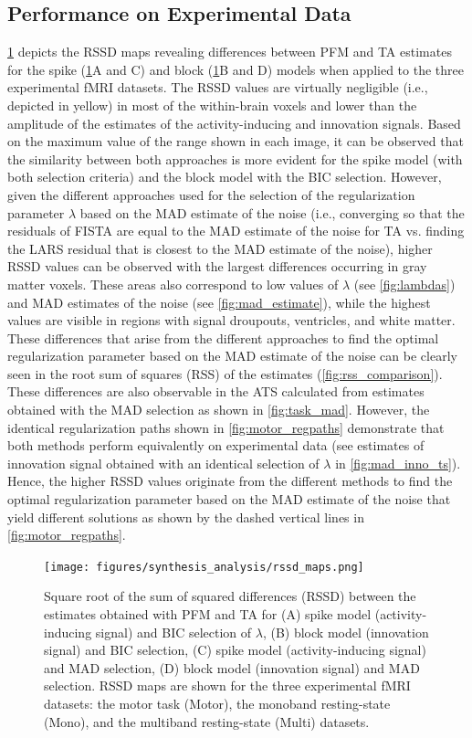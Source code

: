 \subsection{Performance on Experimental Data}

\cref{fig:rss} depicts the RSSD maps revealing differences between
PFM and TA estimates for the spike (\cref{fig:rss}A and C) and block
(\cref{fig:rss}B and D) models when applied to the three experimental fMRI
datasets. The RSSD values are virtually negligible (i.e., depicted in yellow) in
most of the within-brain voxels and lower than the amplitude of the estimates of
the activity-inducing and innovation signals. Based on the maximum value of the
range shown in each image, it can be observed that the similarity between both
approaches is more evident for the spike model (with both selection criteria)
and the block model with the BIC selection. However, given the different
approaches used for the selection of the regularization parameter $\lambda$
based on the MAD estimate of the noise (i.e., converging so that the residuals
of FISTA are equal to the MAD estimate of the noise for TA vs. finding the LARS
residual that is closest to the MAD estimate of the noise), higher RSSD values
can be observed with the largest differences occurring in gray matter voxels.
These areas also correspond to low values of $\lambda$ (see \cref{fig:lambdas})
and MAD estimates of the noise (see \cref{fig:mad_estimate}), while the highest
values are visible in regions with signal droupouts, ventricles, and white
matter. These differences that arise from the different approaches to find the
optimal regularization parameter based on the MAD estimate of the noise can be
clearly seen in the root sum of squares (RSS) of the estimates
(\cref{fig:rss_comparison}). These differences are also observable in the
ATS calculated from estimates obtained with the MAD selection as
shown in \cref{fig:task_mad}. However, the identical regularization paths shown
in \cref{fig:motor_regpaths} demonstrate that both methods perform equivalently
on experimental data (see estimates of innovation signal obtained with an
identical selection of $\lambda$ in \cref{fig:mad_inno_ts}). Hence, the higher
RSSD values originate from the different methods to find the optimal
regularization parameter based on the MAD estimate of the noise that yield
different solutions as shown by the dashed vertical lines in
\cref{fig:motor_regpaths}.

\begin{figure}[t!]
    \begin{center}
        \texttt{[image: figures/synthesis\_analysis/rssd\_maps.png]}
    \end{center}
    \caption{Square root of the sum of squared differences (RSSD) between the estimates obtained with PFM and TA for (A) spike model (activity-inducing signal) and BIC selection of $\lambda$, (B) block model (innovation signal) and BIC selection, (C) spike model (activity-inducing signal) and MAD selection, (D) block model (innovation signal) and MAD selection. RSSD maps are shown for the three experimental fMRI datasets: the motor task (Motor), the monoband resting-state (Mono), and the multiband resting-state (Multi) datasets.}
\label{fig:rss}
\end{figure}

